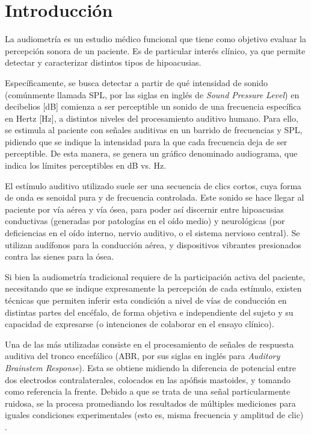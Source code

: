 \section{Introducción} \label{introduccion}

La audiometría es un estudio médico funcional que tiene como objetivo evaluar la percepción sonora de un paciente. Es de particular interés clínico, ya que permite detectar y caracterizar distintos tipos de hipoacusias.

Específicamente, se busca detectar a partir de qué intensidad de sonido (comúnmente llamada SPL, por las siglas en inglés de \textit{Sound Pressure Level}) en decibelios [dB] comienza a ser perceptible un sonido de una frecuencia específica en Hertz [Hz], a distintos niveles del procesamiento auditivo humano. Para ello, se estimula al paciente con señales auditivas en un barrido de frecuencias y SPL, pidiendo que se indique la intensidad para la que cada frecuencia deja de ser perceptible. De esta manera, se genera un gráfico denominado audiograma, que indica los límites perceptibles en dB vs. Hz.

El estímulo auditivo utilizado suele ser una secuencia de clics cortos, cuya forma de onda es senoidal pura y de frecuencia controlada. Este sonido se hace llegar al paciente por vía aérea y vía ósea, para poder así discernir entre hipoacusias conductivas (generadas por patologías en el oído medio) y neurológicas (por deficiencias en el oído interno, nervio auditivo, o el sistema nervioso central). Se utilizan audífonos para la conducción aérea, y dispositivos vibrantes presionados contra las sienes para la ósea.

Si bien la audiometría tradicional requiere de la participación activa del paciente, necesitando que se indique expresamente la percepción de cada estímulo, existen técnicas que permiten inferir esta condición a nivel de vías de conducción en distintas partes del encéfalo, de forma objetiva e independiente del sujeto y su capacidad de expresarse (o intenciones de colaborar en el ensayo clínico).

Una de las más utilizadas consiste en el procesamiento de señales de respuesta auditiva del tronco encefálico (ABR, por sus siglas en inglés para \textit{Auditory Brainstem Response}). Esta se obtiene midiendo la diferencia de potencial entre dos electrodos contralaterales, colocados en las apófisis mastoides, y tomando como referencia la frente.
Debido a que se trata de una señal particularmente ruidosa, se la procesa promediando los resultados de múltiples mediciones para iguales condiciones experimentales (esto es, misma frecuencia y amplitud de clic) \cite{young-ABR}.

